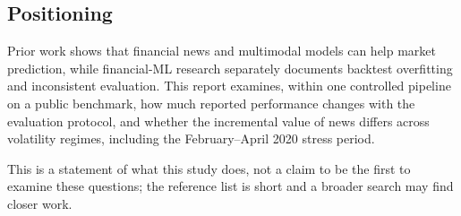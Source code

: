 \subsection{Positioning}
\begin{keybox}
Prior work shows that financial news and multimodal models can help market prediction, while financial-ML research separately documents backtest overfitting and inconsistent evaluation. This report examines, within one controlled pipeline on a public benchmark, how much reported performance changes with the evaluation protocol, and whether the incremental value of news differs across volatility regimes, including the February--April 2020 stress period.
\end{keybox}
This is a statement of what this study does, not a claim to be the first to examine these questions; the reference list is short and a broader search may find closer work.
